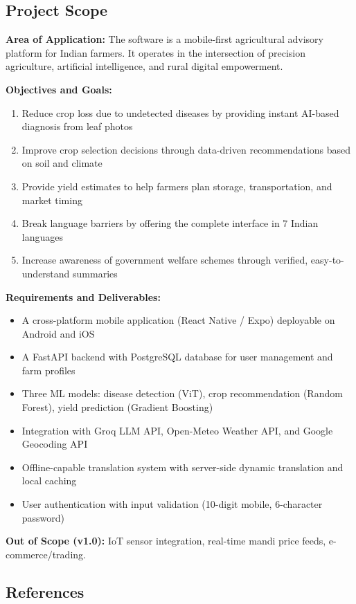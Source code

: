 \documentclass[12pt,a4paper]{article}
\begin{document}
\subsection{Project Scope}

\textbf{Area of Application:} The software is a mobile-first agricultural advisory platform for Indian farmers. It operates in the intersection of precision agriculture, artificial intelligence, and rural digital empowerment.

\textbf{Objectives and Goals:}
\begin{enumerate}
    \item Reduce crop loss due to undetected diseases by providing instant AI-based diagnosis from leaf photos
    \item Improve crop selection decisions through data-driven recommendations based on soil and climate
    \item Provide yield estimates to help farmers plan storage, transportation, and market timing
    \item Break language barriers by offering the complete interface in 7 Indian languages
    \item Increase awareness of government welfare schemes through verified, easy-to-understand summaries
\end{enumerate}

\textbf{Requirements and Deliverables:}
\begin{itemize}
    \item A cross-platform mobile application (React Native / Expo) deployable on Android and iOS
    \item A FastAPI backend with PostgreSQL database for user management and farm profiles
    \item Three ML models: disease detection (ViT), crop recommendation (Random Forest), yield prediction (Gradient Boosting)
    \item Integration with Groq LLM API, Open-Meteo Weather API, and Google Geocoding API
    \item Offline-capable translation system with server-side dynamic translation and local caching
    \item User authentication with input validation (10-digit mobile, 6-character password)
\end{itemize}

\textbf{Out of Scope (v1.0):} IoT sensor integration, real-time mandi price feeds, e-commerce/trading.

\subsection{References}
\end{document}
